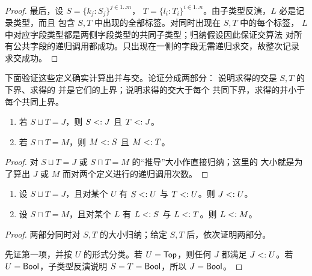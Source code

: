 \begin{taplauthorsolutionentrybox}
\begin{proof}
最后，设 \(S=\{k_j:S_j\}^{j\in1..m}\)，
\(T=\{l_i:T_i\}^{i\in1..n}\)。由子类型反演，\(L\) 必是记录类型，而且
包含 \(S,T\) 中出现的全部标签。对同时出现在 \(S,T\) 中的每个标签，
\(L\) 中对应字段类型都是两侧字段类型的共同子类型；归纳假设因此保证交算法
对所有公共字段的递归调用都成功。只出现在一侧的字段无需递归求交，故整次记录
求交成功。
\end{proof}

下面验证这些定义确实计算出并与交。论证分成两部分：
说明求得的交是 \(S,T\) 的下界、求得的
并是它们的上界；说明求得的交大于每个
共同下界，求得的并小于每个共同上界。

\taplstatementliststart
\begin{taplappendixproposition}
\label{prop:appendix-a11}
\taplstatementlistbreak
\begin{enumerate}
\item 若 \(S\sqcup T=J\)，则 \(S\mathrel{<:} J\) 且 \(T\mathrel{<:} J\)。
\item 若 \(S\sqcap T=M\)，则 \(M\mathrel{<:} S\) 且 \(M\mathrel{<:} T\)。
\end{enumerate}
\end{taplappendixproposition}

\begin{proof}
对 \(S\sqcup T=J\) 或 \(S\sqcap T=M\) 的“推导”大小作直接归纳；这里的
大小就是为了算出 \(J\) 或 \(M\) 而对两个定义进行的递归调用次数。
\end{proof}

\taplstatementliststart
\begin{taplappendixproposition}
\label{prop:appendix-a12}
\taplstatementlistbreak
\begin{enumerate}
\item 设 \(S\sqcup T=J\)，且对某个 \(U\) 有
  \(S\mathrel{<:} U\) 与 \(T\mathrel{<:} U\)。则 \(J\mathrel{<:} U\)。
\item 设 \(S\sqcap T=M\)，且对某个 \(L\) 有
  \(L\mathrel{<:} S\) 与 \(L\mathrel{<:} T\)。则 \(L\mathrel{<:} M\)。
\end{enumerate}
\end{taplappendixproposition}

\begin{proof}
两部分同时对 \(S,T\) 的大小归纳；给定 \(S,T\) 后，依次证明两部分。

先证第一项，并按 \(U\) 的形式分类。若 \(U=\mathsf{Top}\)，则任何 \(J\)
都满足 \(J\mathrel{<:} U\)。若 \(U=\mathsf{Bool}\)，子类型反演说明
\(S=T=\mathsf{Bool}\)，所以 \(J=\mathsf{Bool}\)。


\end{proof}
\end{taplauthorsolutionentrybox}

